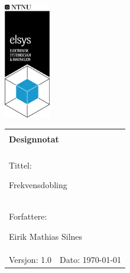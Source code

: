\begin{minipage}[c]{0.15\textwidth}
\includegraphics[width=2.0cm]{Bilder/elsys_pos_staaende_ntnu.png}  
\end{minipage}
\begin{minipage}[c]{0.85\textwidth}

\renewcommand{\arraystretch}{1.7}
\large 
\begin{tabularx}{\textwidth}{|X|X|}
\hline
\multicolumn{2}{|l|}{} \\
\multicolumn{2}{|l|}{\huge \textbf{Designnotat}} \\
\multicolumn{2}{|l|}{}  \\
\hline
\multicolumn{2}{|l|}{Tittel: 

Frekvensdobling 
} \\
\hline
\multicolumn{2}{|l|}{Forfattere: 

Eirik Mathias Silnes
} \\
\hline

Versjon: 1.0 & Dato: \today
\\
\hline 
\end{tabularx}
\end{minipage}
\normalsize